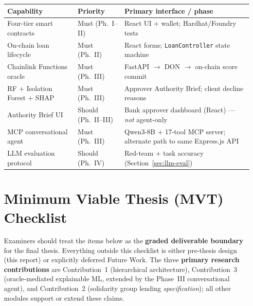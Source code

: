 \documentclass[12pt,a4paper]{report}
\newcommand{\tableheadcolor}{\rowcolor{TableHeadBg}}
\begin{document}
\begin{table}[H]
\centering
\begin{tabular}{p{3.2cm}p{2.2cm}p{7.8cm}}
\toprule
\tableheadcolor
\textbf{Capability} & \textbf{Priority} & \textbf{Primary interface / phase} \\
\midrule
Four-tier smart contracts & Must (Ph.~I--II) & React UI + wallet; Hardhat/Foundry tests \\
On-chain loan lifecycle & Must (Ph.~II) & React forms; \texttt{LoanController} state machine \\
Chainlink Functions oracle & Must (Ph.~III) & FastAPI $\to$ DON $\to$ on-chain score commit \\
RF + Isolation Forest + SHAP & Must (Ph.~III) & Approver Authority Brief; client decline reasons \\
Authority Brief UI & Should (Ph.~II--III) & Bank approver dashboard (React) --- \textit{not} agent-only \\
MCP conversational agent & Must (Ph.~III) & Qwen3-8B + 17-tool MCP server; alternate path to same Express.js API \\
LLM evaluation protocol & Should (Ph.~IV) & Red-team + task accuracy (Section~\ref{sec:llm-eval}) \\
\bottomrule
\end{tabular}
\end{table}

\section{Minimum Viable Thesis (MVT) Checklist}
\label{sec:mvt-checklist}

Examiners should treat the items below as the \textbf{graded deliverable boundary} for the final thesis. Everything outside this checklist is either pre-thesis design (this report) or explicitly deferred Future Work. The three \textbf{primary research contributions} are Contribution~1 (hierarchical architecture), Contribution~3 (oracle-mediated explainable ML, extended by the Phase~III conversational agent), and Contribution~2 (solidarity group lending \textit{specification}); all other modules support or extend these claims.
\end{document}
